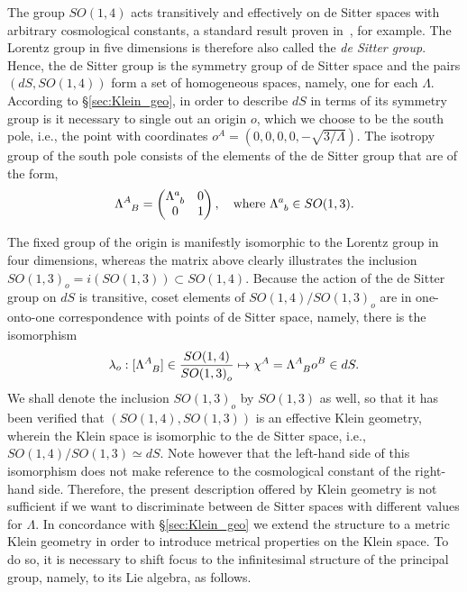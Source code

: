 \documentclass[
final,
11pt,
a4paper,
DIV=11,
headinclude=true,
footinclude=false,
bibliography=totoc,
twoside=true,  %
BCOR=5mm
]{scrbook}
\begin{document}
The group $SO(1,4)$ acts transitively and effectively on de 
Sitter spaces with arbitrary cosmological constants, a standard 
result proven in~\cite{kob1996found}, for example. The Lorentz 
group in five dimensions is therefore also called the \emph{de 
  Sitter group}.  Hence, the de Sitter group is the symmetry 
group of de Sitter space and the pairs $(dS,SO(1,4))$ form a set 
of homogeneous spaces, namely, one for each $\Lambda$. According 
to \S\ref{sec:Klein_geo}, in order to describe $dS$ in terms of 
its symmetry group is it necessary to single out an origin $o$, 
which we choose to be the south pole, i.e., the point with 
coordinates $o^A = (0, 0, 0, 0, -\sqrt{3/\Lambda})$.  The 
isotropy group of the south pole consists of the elements of the 
de Sitter group that are of the form,
\begin{equation}
\label{eq:SO(1,3)_o_isotropy}
  \Lambda\ind{^A_B} =
\begin{pmatrix}
  \Lambda\ind{^a_b} & 0 \\
  0     & 1
\end{pmatrix},
\quad
\text{where}~\Lambda\ind{^a_b} \in SO(1,3).
\end{equation}

The fixed group of the origin is manifestly isomorphic to the 
Lorentz group in four dimensions, whereas the matrix above 
clearly illustrates the inclusion ${SO(1,3)}_o = i(SO(1,3)) 
\subset SO(1,4)$.  Because the action of the de Sitter group on 
$dS$ is transitive, coset elements of $SO(1,4)/{SO(1,3)}_o$ are 
in one-onto-one correspondence with points of de Sitter space, 
namely, there is the isomorphism
\begin{equation}
\label{eq:isom_cosets_dS}
  \lambda_o : [\Lambda\ind{^A_B}] \in \frac{SO(1,4)}{{SO(1,3)}_o}
  \mapsto
  \chi^A = \Lambda\ind{^A_B} o^B \in dS.
\end{equation}
We shall denote the inclusion ${SO(1,3)}_o$ by $SO(1,3)$ as well, 
so that it has been verified that $(SO(1,4),SO(1,3))$ is an 
effective Klein geometry, wherein the Klein space is isomorphic 
to the de Sitter space, i.e., $SO(1,4)/SO(1,3) \simeq dS$. Note 
however that the left-hand side of this isomorphism does not make 
reference to the cosmological constant of the right-hand side.  
Therefore, the present description offered by Klein geometry is 
not sufficient if we want to discriminate between de Sitter 
spaces with different values for $\Lambda$. In concordance with 
\S\ref{sec:Klein_geo} we extend the structure to a metric Klein 
geometry in order to introduce metrical properties on the Klein 
space. To do so, it is necessary to shift focus to the 
infinitesimal structure of the principal group, namely, to its 
Lie algebra, as follows.
\end{document}
